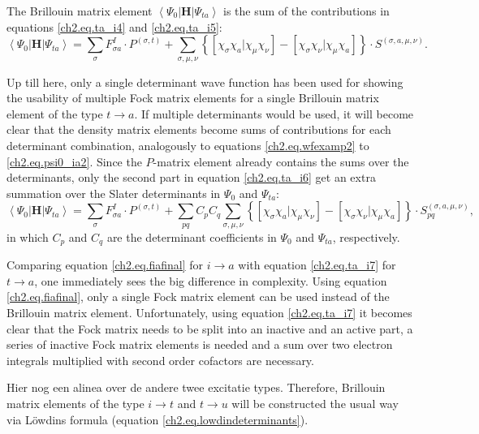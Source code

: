The Brillouin matrix element $\left< \Psi_0 | \mathbf{H} | \Psi_{ta} \right>$ is the sum of the contributions in equations \ref{ch2.eq.ta_i4} and \ref{ch2.eq.ta_i5}:
\begin{equation}
\left< \Psi_0 | \mathbf{H} | \Psi_{ta} \right> = \sum_{\sigma} F^{I}_{\sigma a} \cdot P^{(\sigma,t)} + \sum_{\sigma,\mu,\nu} \left\{ \left[ \chi_\sigma \chi_a | \chi_\mu \chi_\nu \right] - \left[ \chi_\sigma \chi_\nu | \chi_\mu \chi_a \right] \right\} \cdot S^{(\sigma,a,\mu,\nu)}.
\label{ch2.eq.ta_i6}
\end{equation}

Up till here, only a single determinant wave function has been used for showing the usability of multiple Fock matrix elements for a single Brillouin matrix element of the type $t \rightarrow a$. If multiple determinants would be used, it will become clear that the density matrix elements become sums of contributions for each determinant combination, analogously to equations \ref{ch2.eq.wfexamp2} to \ref{ch2.eq.psi0_ia2}. Since the $P$-matrix element already contains the sums over the determinants, only the second part in equation \ref{ch2.eq.ta_i6} get an extra summation over the Slater determinants in $\Psi_0$ and $\Psi_{ta}$:
\begin{equation}
\left< \Psi_0 | \mathbf{H} | \Psi_{ta} \right> = \sum_{\sigma} F^{I}_{\sigma a} \cdot P^{(\sigma,t)} + \sum_{pq} C_p C_q\sum_{\sigma,\mu,\nu} \left\{ \left[ \chi_\sigma \chi_a | \chi_\mu \chi_\nu \right] - \left[ \chi_\sigma \chi_\nu | \chi_\mu \chi_a \right] \right\} \cdot S_{pq}^{(\sigma,a,\mu,\nu)},
\label{ch2.eq.ta_i7}
\end{equation}
in which $C_p$ and $C_q$ are the determinant coefficients in $\Psi_0$ and $\Psi_{ta}$, respectively. 

Comparing equation \ref{ch2.eq.fiafinal} for $i \rightarrow a$ with equation \ref{ch2.eq.ta_i7} for $t \rightarrow a$, one immediately sees the big difference in complexity. Using equation \ref{ch2.eq.fiafinal}, only a single Fock matrix element can be used instead of the Brillouin matrix element. Unfortunately, using equation \ref{ch2.eq.ta_i7} it becomes clear that the Fock matrix needs to be split into an inactive and an active part, a series of inactive Fock matrix elements is needed and a sum over two electron integrals multiplied with second order cofactors are necessary.

Hier nog een alinea over de andere twee excitatie types.
Therefore, Brillouin matrix elements of the type $i \rightarrow t$ and $t \rightarrow u$ will be constructed the usual way via L\"{o}wdins formula (equation \ref{ch2.eq.lowdindeterminants}).


